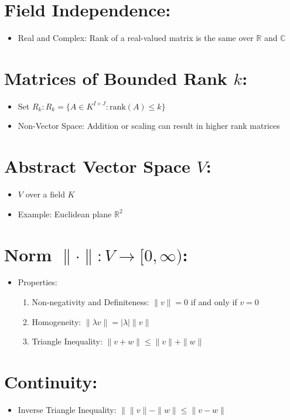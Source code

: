 \documentclass{article}
\begin{document}
\section{Field Independence:}
\begin{itemize}
    \item Real and Complex: Rank of a real-valued matrix is the same over $\mathbb{R}$ and $\mathbb{C}$
\end{itemize}

\section{Matrices of Bounded Rank $k$:}
\begin{itemize}
    \item Set $R_k: R_k = \{ A \in K^{I \times J} : \text{rank}(A) \leq k \}$
    \item Non-Vector Space: Addition or scaling can result in higher rank matrices
\end{itemize}

\section{Abstract Vector Space $V$:}
\begin{itemize}
    \item $V$ over a field $K$
    \item Example: Euclidean plane $\mathbb{R}^2$
\end{itemize}

\section{Norm $\| \cdot \| : V \to [0, \infty)$:}
\begin{itemize}
    \item Properties:
    \begin{enumerate}
        \item Non-negativity and Definiteness: $\|v\| = 0$ if and only if $v = 0$
        \item Homogeneity: $\|\lambda v\| = |\lambda|\|v\|$
        \item Triangle Inequality: $\|v + w\| \leq \|v\| + \|w\|$
    \end{enumerate}
\end{itemize}

\section{Continuity:}
\begin{itemize}
    \item Inverse Triangle Inequality: $\| \|v\| - \|w\| \leq \|v - w\|$
\end{itemize}
\end{document}
